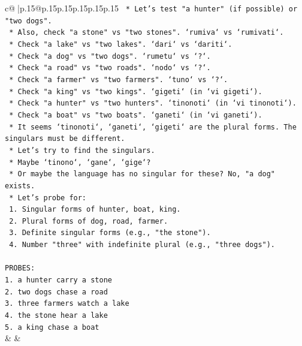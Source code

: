 \documentclass{article}
\begin{document}
{\begin{supertabular}{c@{$\;$}|p{.15\linewidth}@{}p{.15\linewidth}p{.15\linewidth}p{.15\linewidth}p{.15\linewidth}p{.15\linewidth}}
{{{\texttt{            *   Let's test "a hunter" (if possible) or "two dogs".} \\
\texttt{            *   Also, check "a stone" vs "two stones". `rumiva` vs `rumivati`.} \\
\texttt{            *   Check "a lake" vs "two lakes". `dari` vs `dariti`.} \\
\texttt{            *   Check "a dog" vs "two dogs". `rumetu` vs `?`.} \\
\texttt{            *   Check "a road" vs "two roads". `nodo` vs `?`.} \\
\texttt{            *   Check "a farmer" vs "two farmers". `tuno` vs `?`.} \\
\texttt{            *   Check "a king" vs "two kings". `gigeti` (in `vi gigeti`).} \\
\texttt{            *   Check "a hunter" vs "two hunters". `tinonoti` (in `vi tinonoti`).} \\
\texttt{            *   Check "a boat" vs "two boats". `ganeti` (in `vi ganeti`).} \\
\texttt{            *   It seems `tinonoti`, `ganeti`, `gigeti` are the plural forms. The singulars must be different.} \\
\texttt{            *   Let's try to find the singulars.} \\
\texttt{            *   Maybe `tinono`, `gane`, `gige`?} \\
\texttt{            *   Or maybe the language has no singular for these? No, "a dog" exists.} \\
\texttt{            *   Let's probe for:} \\
\texttt{                1.  Singular forms of hunter, boat, king.} \\
\texttt{                2.  Plural forms of dog, road, farmer.} \\
\texttt{                3.  Definite singular forms (e.g., "the stone").} \\
\texttt{                4.  Number "three" with indefinite plural (e.g., "three dogs").} \\
\\ 
\texttt{PROBES:} \\
\texttt{1. a hunter carry a stone} \\
\texttt{2. two dogs chase a road} \\
\texttt{3. three farmers watch a lake} \\
\texttt{4. the stone hear a lake} \\
\texttt{5. a king chase a boat} \\
            }
        }
    }
    & & \\ \\


\end{supertabular}}
\end{document}
